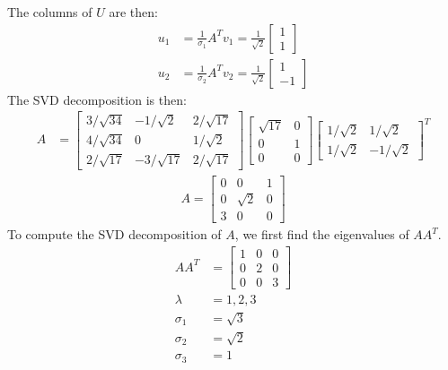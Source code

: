 \documentclass{article}
\begin{document}
The columns of $U$ are then:
\begin{align*}
    u_1 & = \frac{1}{\sigma_1}A^Tv_1 = \frac{1}{\sqrt{2}}\begin{bmatrix}
        1 \\ 1
    \end{bmatrix} \\
    u_2 & = \frac{1}{\sigma_2}A^Tv_2 = \frac{1}{\sqrt{2}}\begin{bmatrix}
        1 \\ -1
    \end{bmatrix}
\end{align*}
The SVD decomposition is then:
\begin{align*}
    A & = \begin{bmatrix}
        3/\sqrt{34} & -1/\sqrt{2} & 2/\sqrt{17} \\ 4/\sqrt{34} & 0 & 1/\sqrt{2} \\ 2/\sqrt{17} & -3/\sqrt{17} & 2/\sqrt{17}
    \end{bmatrix}\begin{bmatrix}
        \sqrt{17} & 0 \\ 0 & 1 \\ 0 & 0 
    \end{bmatrix}\begin{bmatrix}
        1/\sqrt{2} & 1/\sqrt{2} \\ 1/\sqrt{2} & -1/\sqrt{2}
    \end{bmatrix}^T
\end{align*}
\begin{align*}
    A = \begin{bmatrix}
        0 & 0 & 1 \\ 0 & \sqrt{2} & 0 \\ 3 & 0 & 0
    \end{bmatrix}
\end{align*}
To compute the SVD decomposition of $A$, we first find the eigenvalues of $AA^T$.
\begin{align*}
    AA^T & = \begin{bmatrix}
        1 & 0 & 0 \\ 0 & 2 & 0 \\ 0 & 0 & 3
    \end{bmatrix} \\
    \lambda & = 1, 2, 3 \\
    \sigma_1 & = \sqrt{3} \\
    \sigma_2 & = \sqrt{2} \\
    \sigma_3 & = 1
\end{align*}
\end{document}
